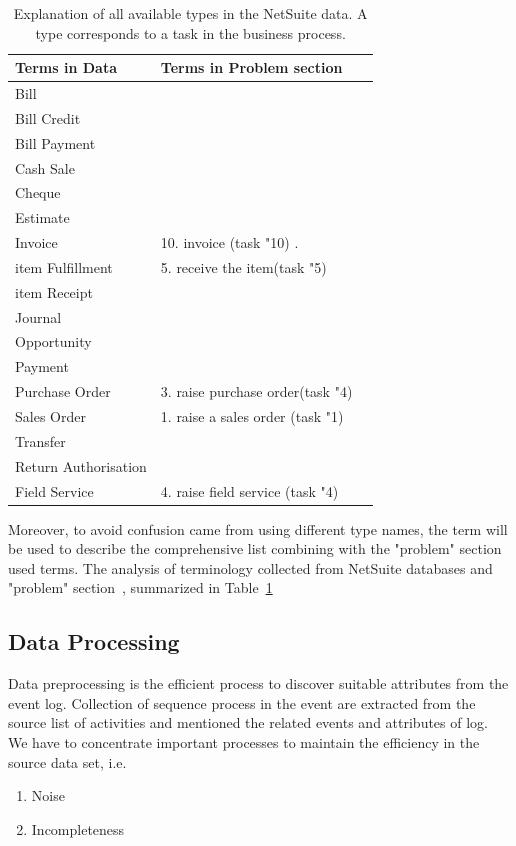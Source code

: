 \begin{table}[htb]
\footnotesize	 %
\begin{tabularx}{\textwidth}{X X X}

\hline
\textbf{Terms in Data} & \textbf{Terms in Problem section} \\
\hline
Bill  &  \\
\hline
Bill Credit  &  \\
\hline
Bill Payment &  \\
\hline
Cash Sale  &  \\
\hline
Cheque  &  \\
\hline
Estimate  &  \\
\hline
Invoice  & 10. invoice (task "10) . \\
\hline
item Fulfillment  & 5. receive the item(task "5) \\
\hline
item Receipt  &  \\
\hline
Journal  &  \\
\hline
Opportunity  &  \\
\hline
Payment  &  \\
\hline
Purchase Order  & 3. raise purchase order(task "4)  \\
\hline
Sales Order  & 1. raise a sales order (task "1)  \\
\hline
Transfer  &  \\
\hline
Return Authorisation  &  \\
\hline
Field Service  & 4. raise field service (task "4)  \\
\hline
\end{tabularx}
\caption{Explanation of all available types in the NetSuite data. A type corresponds to a task in the business process.}
\label{table:terminologyData}
\end{table}


Moreover, to avoid confusion came from using different type names, the term will be used to describe the comprehensive list combining with the "problem" section~\pageref{figure:soAndfieldservice} used terms. The analysis of terminology collected from NetSuite databases and "problem" section~\pageref{figure:soAndfieldservice}, summarized in Table~\ref{table:terminologyData}






\subsection{Data Processing}
Data preprocessing is the efficient process to discover suitable attributes from the event log. Collection of sequence process in the event are extracted from the source list of activities and mentioned the related events and attributes of log. We have to concentrate important processes to maintain the efficiency in the source data set, i.e.
\begin{enumerate}
    \item Noise
    \item Incompleteness
\end{enumerate}

